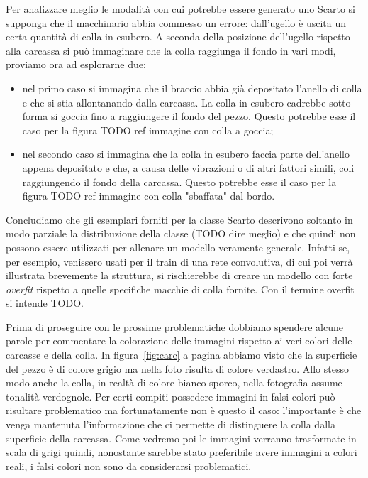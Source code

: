 Per analizzare meglio le modalità con cui potrebbe essere generato uno Scarto si supponga che il macchinario abbia commesso un errore: dall'ugello è uscita un certa quantità di colla in esubero.
A seconda della posizione dell'ugello rispetto alla carcassa si può immaginare che la colla raggiunga il fondo in vari modi, proviamo ora ad esplorarne due:
\begin{itemize}
  \item nel primo caso si immagina che il braccio abbia già depositato l'anello di colla e che si stia allontanando dalla carcassa.
    La colla in esubero cadrebbe sotto forma si goccia fino a raggiungere il fondo del pezzo.
    Questo potrebbe esse il caso per la figura TODO ref immagine con colla a goccia;
  \item nel secondo caso si immagina che la colla in esubero faccia parte dell'anello appena depositato e che, a causa delle vibrazioni o di altri fattori simili, coli raggiungendo il fondo della carcassa.
    Questo potrebbe esse il caso per la figura TODO ref immagine con colla "sbaffata" dal bordo.
\end{itemize}

Concludiamo che gli esemplari forniti per la classe Scarto descrivono soltanto in modo parziale la distribuzione della classe (TODO dire meglio) e che quindi non possono essere utilizzati per allenare un modello veramente generale.
Infatti se, per esempio, venissero usati per il train di una rete convolutiva, di cui poi verrà illustrata brevemente la struttura, si rischierebbe di creare un modello con forte \textit{overfit} rispetto a quelle specifiche macchie di colla fornite.
Con il termine overfit si intende TODO.


Prima di proseguire con le prossime problematiche dobbiamo spendere alcune parole per commentare la colorazione delle immagini rispetto ai veri colori delle carcasse e della colla.
In figura~\ref{fig:carc} a pagina \pageref{fig:carc} abbiamo visto che la superficie del pezzo è di colore grigio ma nella foto risulta di colore verdastro.
Allo stesso modo anche la colla, in realtà di colore bianco sporco, nella fotografia assume tonalità verdognole.
Per certi compiti possedere immagini in falsi colori può risultare problematico ma fortunatamente non è questo il caso: l'importante è che venga mantenuta l'informazione che ci permette di distinguere la colla dalla superficie della carcassa.
Come vedremo poi le immagini verranno trasformate in scala di grigi quindi, nonostante sarebbe stato preferibile avere immagini a colori reali, i falsi colori non sono da considerarsi problematici.

